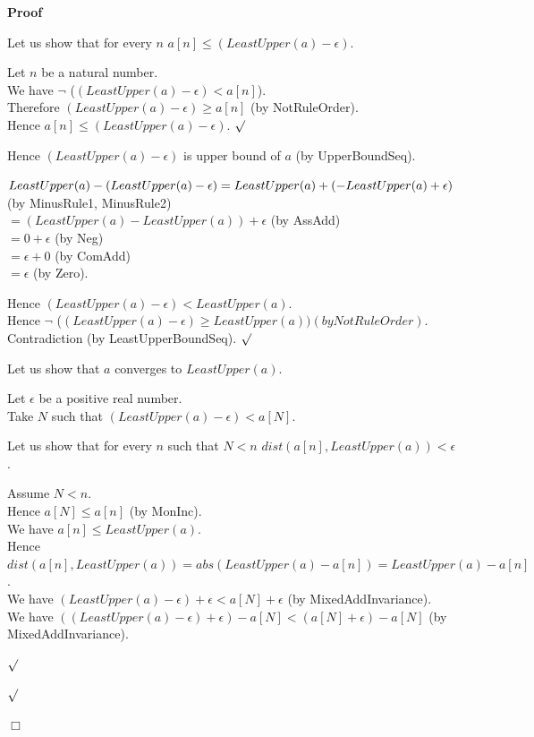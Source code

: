 \documentclass{article}
\newenvironment{forthel}{\begin{leftbar}}{\end{leftbar}}
\newenvironment{proof}{\noindent\textbf{Proof\ }}{\hspace*{\fill}$\Box$\medskip}
\newenvironment{subproof}{\begin{list}{}{}
		\item[\text{Proof}]}{\hfill $\surd$ \end{list}}
\newcommand{\dotequal}{=}
\begin{document}
\begin{forthel}
\begin{proof}
\begin{subproof}
			Let us show that for every $n$ $a[n] \leq (LeastUpper(a) - \epsilon)$.
			\begin{subproof}
				Let $n$ be a natural number.\\
				We have $\neg$ ($(LeastUpper(a) - \epsilon) < a[n]$).\\
				Therefore $(LeastUpper(a) - \epsilon) \geq a[n]$ (by NotRuleOrder).\\
				Hence $a[n] \leq (LeastUpper(a) - \epsilon)$.
			\end{subproof}
			Hence $(LeastUpper(a) - \epsilon)$ is upper bound of $a$ (by UpperBoundSeq).
			
			$LeastUpper(a) - (LeastUpper(a) - \epsilon)\\ \dotequal LeastUpper(a) + (-LeastUpper(a) + \epsilon)$ (by MinusRule1, MinusRule2)\\
			$\dotequal (LeastUpper(a) - LeastUpper(a)) + \epsilon$ (by AssAdd)\\
			$\dotequal 0 + \epsilon$ (by Neg)\\
			$\dotequal \epsilon + 0$ (by ComAdd)\\
			$\dotequal \epsilon$ (by Zero).

			Hence $(LeastUpper(a) - \epsilon) < LeastUpper(a)$.\\
			Hence $\neg$ ($(LeastUpper(a) - \epsilon) \geq LeastUpper(a)) (by NotRuleOrder)$.\\
			Contradiction (by LeastUpperBoundSeq).
		\end{subproof}
		
		\noindent Let us show that $a$ converges to $LeastUpper(a)$.
		
		\begin{subproof}
			Let $\epsilon$ be a positive real number.\\
			Take $N$ such that $(LeastUpper(a) - \epsilon) < a[N]$.
			
			Let us show that for every $n$ such that $N < n$ $dist(a[n],LeastUpper(a)) < \epsilon$.
			\begin{subproof}
				Assume $N < n$.\\
				Hence $a[N] \leq a[n]$ (by MonInc).\\
				We have $a[n] \leq LeastUpper(a)$.\\
				Hence $dist(a[n],LeastUpper(a)) = abs(LeastUpper(a) - a[n]) = LeastUpper(a) - a[n]$.\\
				We have $(LeastUpper(a) - \epsilon) + \epsilon < a[N] + \epsilon$ (by MixedAddInvariance).\\
				We have $((LeastUpper(a) - \epsilon) + \epsilon) - a[N] < (a[N] + \epsilon) - a[N]$ (by MixedAddInvariance).
				

\end{subproof}
\end{subproof}
\end{proof}
\end{forthel}
\end{document}
